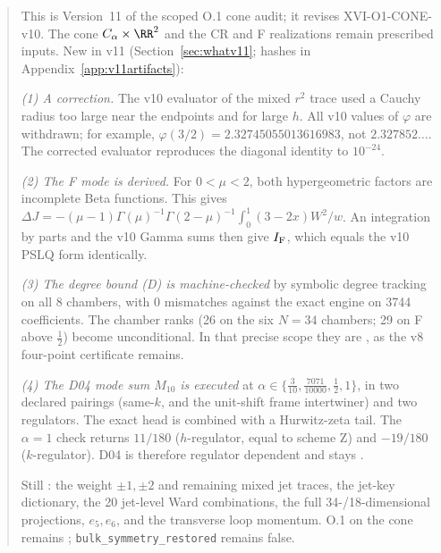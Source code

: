 \begin{abstract}
This is Version~11 of the scoped O.1 cone audit; it revises
XVI-O1-CONE-v10. The cone \(C_\alpha\times\RR^2\) and the CR and F
realizations remain prescribed inputs. New in v11
(Section~\ref{sec:whatv11}; hashes in Appendix~\ref{app:v11artifacts}):

\emph{(1) A correction.} The v10 evaluator of the mixed \(r^2\) trace
used a Cauchy radius too large near the endpoints and for large
\(h\). All v10 values of \(\varphi\) are withdrawn; for example,
\(\varphi(3/2)=2.32745055013616983\), not \(2.327852\dots\). The
corrected evaluator reproduces the diagonal identity to
\(10^{-24}\).

\emph{(2) The F mode is derived.} For \(0<\mu<2\), both
hypergeometric factors are incomplete Beta functions. This gives
\(\Delta J=-(\mu-1)\Gamma(\mu)^{-1}\Gamma(2-\mu)^{-1}\int_0^1(3-2x)W^2/w\).
An integration by parts and the v10 Gamma sums then give
\(I_{\rm F}\), which equals the v10 PSLQ form identically.

\emph{(3) The degree bound (D) is machine-checked} by symbolic degree
tracking on all 8 chambers, with 0 mismatches against the exact
engine on 3744 coefficients. The chamber ranks (26 on the six
\(N=34\) chambers; 29 on F above \(\tfrac12\)) become unconditional.
In that precise scope they are
\CPIR, as the v8 four-point certificate remains.

\emph{(4) The D04 mode sum \(M_{10}\) is executed} at
\(\alpha\in\{\tfrac3{10},\tfrac{7071}{10000},\tfrac12,1\}\), in two
declared pairings (same-\(k\), and the unit-shift frame intertwiner)
and two regulators. The exact head is combined with a Hurwitz-zeta
tail. The \(\alpha=1\) check returns \(11/180\) (\(h\)-regulator,
equal to scheme Z) and \(-19/180\) (\(k\)-regulator). D04 is
therefore regulator dependent and stays \PARTIAL.

Still \OPEN: the weight \(\pm1,\pm2\) and remaining mixed jet
traces, the jet-key dictionary, the 20 jet-level Ward combinations,
the full 34-/18-dimensional projections, \(e_5,e_6\), and the
transverse loop momentum. O.1 on the cone remains \NOTCLOSED;
\texttt{bulk\_symmetry\_restored} remains false.
\end{abstract}
